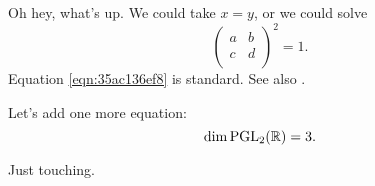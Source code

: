\documentclass[reqno]{amsart} 
\begin{document}
Oh hey, what's up.  We could take $x = y$, or we could solve
\begin{equation}\label{eqn:35ac136ef8}
  \begin{pmatrix}
    a & b \\
    c & d \\
  \end{pmatrix}^2 = 1.
\end{equation}
Equation \eqref{eqn:35ac136ef8} is standard.  See also \cite{2021arXiv210915230N}.

Let's add one more equation:
\begin{equation*}
\dim \operatorname{PGL}_2(\mathbb{R}) = 3.
\end{equation*}

Just touching.

{} 
\end{document}
